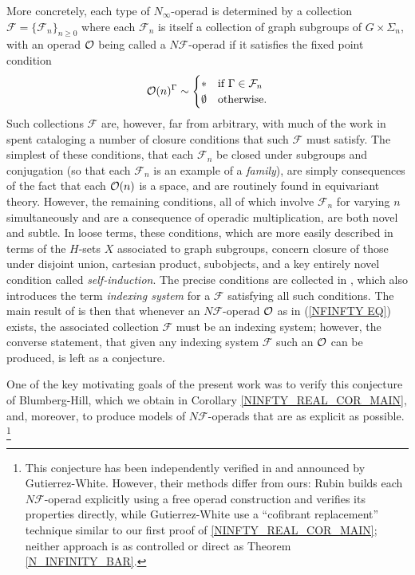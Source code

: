 \documentclass[a4paper,10pt]{article}%
\begin{document}
More concretely, each type of $N_{\infty}$-operad is determined by a collection $\mathcal{F} = \{\mathcal{F}_n\}_{n \geq 0}$ where each $\mathcal{F}_n$ is itself a collection of graph subgroups of $G \times \Sigma_n$, with an operad $\mathcal{O}$ being called a $N \mathcal{F}$-operad if it satisfies the fixed point condition
\begin{equation}\label{NFINFTY EQ}
	\O(n)^{\Gamma} \sim 
\begin{cases}
	\** & \text{if } \Gamma \in \mathcal{F}_n
\\
	\emptyset & \text{otherwise}.
\end{cases}
\end{equation}
Such collections $\mathcal{F}$ are, however, far from arbitrary, with much of the work in \cite[\S 3]{BH15} spent cataloging a number of closure conditions that such $\mathcal{F}$ must satisfy.
The simplest of these conditions, that each 
$\mathcal{F}_n$ be closed under subgroups and conjugation 
(so that each $\mathcal{F}_n$ is an example of a \textit{family}),
are simply consequences of the fact that each $\mathcal{O}(n)$ is a space, and are routinely found in equivariant theory.
However, the remaining conditions,
all of which involve $\mathcal{F}_n$ for varying $n$ simultaneously and are a consequence of operadic multiplication,
are both novel and subtle.
In loose terms, these conditions, 
which are more easily described in terms of the $H$-sets $X$ associated to graph subgroups,
concern closure of those under 
disjoint union, cartesian product, subobjects,
and a key entirely novel condition called \textit{self-induction}.
The precise conditions are collected in
\cite[Def. 3.22]{BH15},
which also introduces the term \textit{indexing system} for 
a $\mathcal{F}$ satisfying all such conditions.
The main result of \cite[\S 4]{BH15} is then that whenever an $N\mathcal F$-operad $\mathcal{O}$ as in (\ref{NFINFTY EQ}) exists, the associated collection $\mathcal{F}$ must be an indexing system;
however, the converse statement, that given any indexing system $\mathcal{F}$ such an $\mathcal{O}$ can be produced, is left as a conjecture.

One of the key motivating goals of the present work was to verify this conjecture of Blumberg-Hill, which we obtain in
Corollary \ref{NINFTY_REAL_COR_MAIN},
and, moreover, to produce models of $N \mathcal{F}$-operads that
are as explicit as possible. 
\footnote{This conjecture has been independently verified in \cite{Rub17} and announced by Gutierrez-White. However, their methods differ from ours: Rubin builds each $N\mathcal F$-operad explicitly using a free operad construction and verifies its properties directly, while Gutierrez-White use a ``cofibrant replacement'' technique similar to our first proof of \ref{NINFTY_REAL_COR_MAIN}; neither approach is as controlled or direct as Theorem \ref{N_INFINITY_BAR}.}
\end{document}
